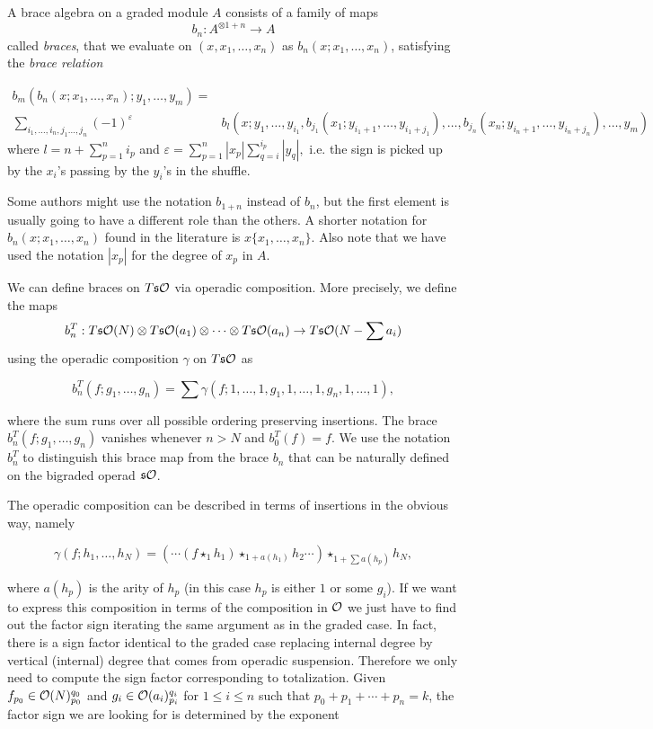 \documentclass[twoside]{article}
\begin{document}
\begin{defi}\label{braces}
A brace algebra on a graded module $A$ consists of a family of maps \[b_n:A^{\otimes 1+n}\to A\] called \emph{braces}, that we evaluate on $(x,x_1,\dots, x_n)$ as $b_n(x;x_1,\dots, x_n)$, satisfying the \emph{brace relation}


\begin{align*}
b_m(b_n(x;x_1,\dots, x_n);y_1,\dots,y_m)=&\\
\sum_{i_1,\dots, i_n, j_1\dots, j_n}(-1)^{\varepsilon}&b_l(x; y_1,\dots, y_{i_1},b_{j_1}(x_1;y_{i_1+1},\dots, y_{i_1+j_1}),\dots, b_{j_n}(x_n;y_{i_n+1},\dots, y_{i_n+j_n}),\dots,y_m)
\end{align*}
where $l=n+\sum_{p=1}^n i_p$ and $\varepsilon=\sum_{p=1}^n|x_p|\sum_{q=i}^{i_p}|y_q|,$ i.e. the sign is picked up by the $x_i$'s passing by the $y_i$'s in the shuffle.



\end{defi}

\begin{remark}
Some authors might use the notation $b_{1+n}$ instead of $b_n$, but the first element is usually going to have a different role than the others. A shorter notation for $b_n(x;x_1,\dots,x_n)$ found in the literature is $x\{x_1,\dots, x_n\}$. Also note that we have used the notation $|x_p|$ for the degree of $x_p$ in $A$. 
\end{remark}

We can define braces on $T\mathfrak{s}{\mathcal O}$ via operadic composition. More precisely, we define the maps 
$$b^T_n:T\mathfrak{s}{\mathcal O}(N)\otimes T\mathfrak{s}{\mathcal O}(a_1)\otimes\cdots\otimes T\mathfrak{s}{\mathcal O}(a_n)\to T\mathfrak{s}{\mathcal O}(N-\sum a_i)$$
using the operadic composition $\gamma$ on $T\mathfrak{s}{\mathcal O}$ as

\[b^T_n(f;g_1,\dots,g_n)=\sum\gamma(f;1,\dots,1,g_1,1,\dots,1,g_n,1,\dots,1),\]

where the sum runs over all possible ordering preserving insertions. The brace $b^T_n(f;g_1,\dots,g_n)$ vanishes whenever $n>N$ and $b^T_0(f)=f$. We use the notation $b^T_n$ to distinguish this brace map from the brace $b_n$ that can be naturally defined on the bigraded operad $\mathfrak{s}{\mathcal O}$.

The operadic composition can be described in terms of insertions in the obvious way, namely 

$$\gamma(f;h_1,\dots, h_N)=(\cdots(f\star_1 h_1)\star_{1+a(h_1)}h_2\cdots)\star_{1+\sum a(h_p)}h_N,$$

where $a(h_p)$ is the arity of $h_p$ (in this case $h_p$ is either $1$ or some $g_i$). If we want to express this composition in terms of the composition in ${\mathcal O}$ we just have to find out the factor sign iterating the same argument as in the graded case. In fact, there is a sign factor identical to the graded case replacing internal degree by vertical (internal) degree that comes from operadic suspension. Therefore we only need to compute the sign factor corresponding to totalization. Given $f_{p_0}\in {\mathcal O}(N)^{q_0}_{p_0}$ and  $g_i\in{\mathcal O}(a_i)^{q_i}_{p_i}$ for $1\leq i\leq n$ such that $p_0+p_1+\cdots+p_n=k$, the factor sign we are looking for is determined by the exponent
\end{document}
